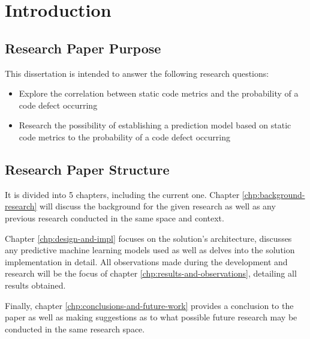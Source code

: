 \chapter{Introduction}\label{chp:intro}

\section{Research Paper Purpose}
This dissertation is intended to answer the following research questions:
\begin{itemize}
\item Explore the correlation between static code metrics and the probability of a code defect occurring
\item Research the possibility of establishing a prediction model based on static code metrics to the probability of a code defect occurring 
\end{itemize}
\section{Research Paper Structure}
It is divided into 5 chapters, including the current one. Chapter \ref{chp:background-research} will discuss the background for the given research as well as any previous research conducted in the same space and context. 

Chapter \ref{chp:design-and-impl} focuses on the solution's architecture, discusses any predictive machine learning models used as well as delves into the solution implementation in detail. All observations made during the development and research will be the focus of chapter \ref{chp:results-and-observations}, detailing all results obtained.

Finally, chapter \ref{chp:conclusions-and-future-work} provides a conclusion to the paper as well as making suggestions as to what possible future research may be conducted in the same research space.

